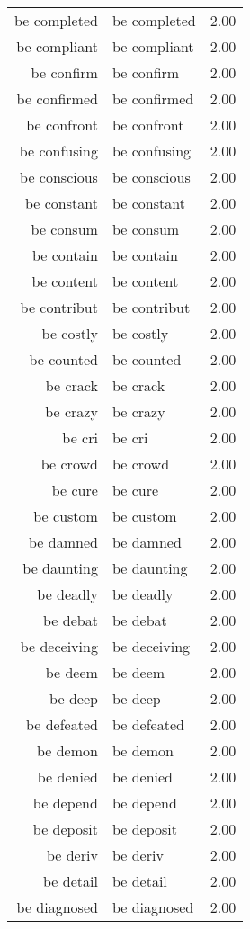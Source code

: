 \begin{table}[ht]
\begin{tabular}{rlr}
  be completed & be completed & 2.00 \\ 
  be compliant & be compliant & 2.00 \\ 
  be confirm & be confirm & 2.00 \\ 
  be confirmed & be confirmed & 2.00 \\ 
  be confront & be confront & 2.00 \\ 
  be confusing & be confusing & 2.00 \\ 
  be conscious & be conscious & 2.00 \\ 
  be constant & be constant & 2.00 \\ 
  be consum & be consum & 2.00 \\ 
  be contain & be contain & 2.00 \\ 
  be content & be content & 2.00 \\ 
  be contribut & be contribut & 2.00 \\ 
  be costly & be costly & 2.00 \\ 
  be counted & be counted & 2.00 \\ 
  be crack & be crack & 2.00 \\ 
  be crazy & be crazy & 2.00 \\ 
  be cri & be cri & 2.00 \\ 
  be crowd & be crowd & 2.00 \\ 
  be cure & be cure & 2.00 \\ 
  be custom & be custom & 2.00 \\ 
  be damned & be damned & 2.00 \\ 
  be daunting & be daunting & 2.00 \\ 
  be deadly & be deadly & 2.00 \\ 
  be debat & be debat & 2.00 \\ 
  be deceiving & be deceiving & 2.00 \\ 
  be deem & be deem & 2.00 \\ 
  be deep & be deep & 2.00 \\ 
  be defeated & be defeated & 2.00 \\ 
  be demon & be demon & 2.00 \\ 
  be denied & be denied & 2.00 \\ 
  be depend & be depend & 2.00 \\ 
  be deposit & be deposit & 2.00 \\ 
  be deriv & be deriv & 2.00 \\ 
  be detail & be detail & 2.00 \\ 
  be diagnosed & be diagnosed & 2.00 \\ 

\end{tabular}
\end{table}
